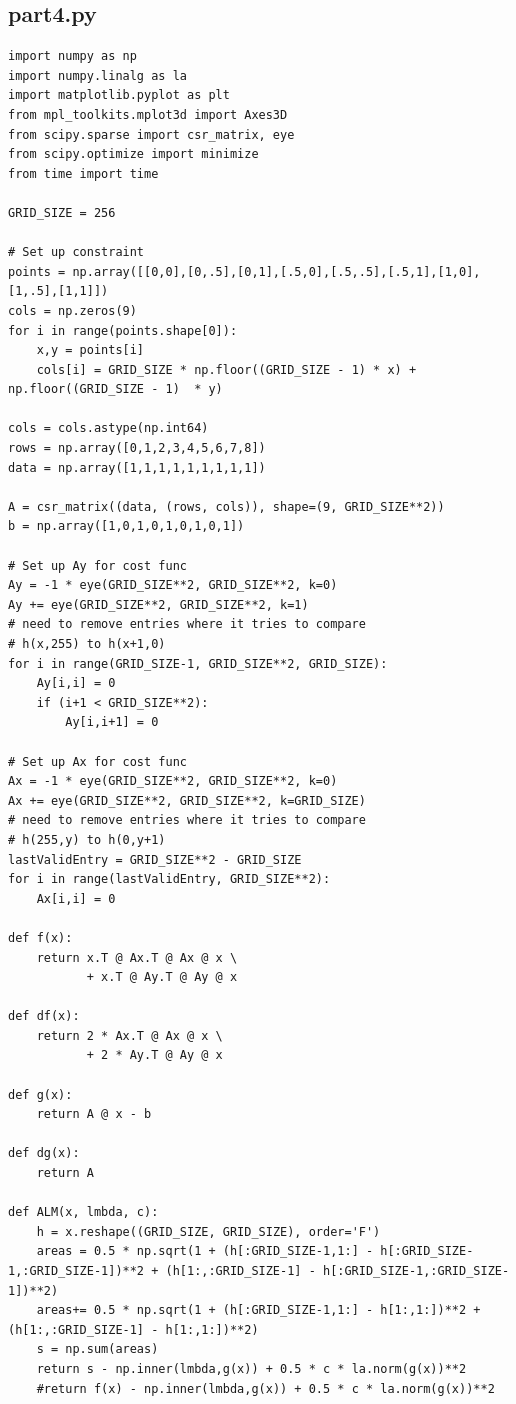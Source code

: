 \documentclass{article}
\begin{document}
\subsection{part4.py}
\begin{verbatim}
import numpy as np
import numpy.linalg as la
import matplotlib.pyplot as plt
from mpl_toolkits.mplot3d import Axes3D
from scipy.sparse import csr_matrix, eye
from scipy.optimize import minimize
from time import time

GRID_SIZE = 256

# Set up constraint
points = np.array([[0,0],[0,.5],[0,1],[.5,0],[.5,.5],[.5,1],[1,0],[1,.5],[1,1]])
cols = np.zeros(9)
for i in range(points.shape[0]):
    x,y = points[i]
    cols[i] = GRID_SIZE * np.floor((GRID_SIZE - 1) * x) + np.floor((GRID_SIZE - 1)  * y)

cols = cols.astype(np.int64)
rows = np.array([0,1,2,3,4,5,6,7,8])
data = np.array([1,1,1,1,1,1,1,1,1])

A = csr_matrix((data, (rows, cols)), shape=(9, GRID_SIZE**2))
b = np.array([1,0,1,0,1,0,1,0,1])

# Set up Ay for cost func
Ay = -1 * eye(GRID_SIZE**2, GRID_SIZE**2, k=0)
Ay += eye(GRID_SIZE**2, GRID_SIZE**2, k=1)
# need to remove entries where it tries to compare
# h(x,255) to h(x+1,0)
for i in range(GRID_SIZE-1, GRID_SIZE**2, GRID_SIZE):
    Ay[i,i] = 0
    if (i+1 < GRID_SIZE**2):
        Ay[i,i+1] = 0

# Set up Ax for cost func
Ax = -1 * eye(GRID_SIZE**2, GRID_SIZE**2, k=0)
Ax += eye(GRID_SIZE**2, GRID_SIZE**2, k=GRID_SIZE)
# need to remove entries where it tries to compare
# h(255,y) to h(0,y+1)
lastValidEntry = GRID_SIZE**2 - GRID_SIZE
for i in range(lastValidEntry, GRID_SIZE**2):
    Ax[i,i] = 0

def f(x):
    return x.T @ Ax.T @ Ax @ x \
           + x.T @ Ay.T @ Ay @ x

def df(x):
    return 2 * Ax.T @ Ax @ x \
           + 2 * Ay.T @ Ay @ x

def g(x):
    return A @ x - b

def dg(x):
    return A

def ALM(x, lmbda, c):
    h = x.reshape((GRID_SIZE, GRID_SIZE), order='F')
    areas = 0.5 * np.sqrt(1 + (h[:GRID_SIZE-1,1:] - h[:GRID_SIZE-1,:GRID_SIZE-1])**2 + (h[1:,:GRID_SIZE-1] - h[:GRID_SIZE-1,:GRID_SIZE-1])**2)
    areas+= 0.5 * np.sqrt(1 + (h[:GRID_SIZE-1,1:] - h[1:,1:])**2 + (h[1:,:GRID_SIZE-1] - h[1:,1:])**2)
    s = np.sum(areas)
    return s - np.inner(lmbda,g(x)) + 0.5 * c * la.norm(g(x))**2
    #return f(x) - np.inner(lmbda,g(x)) + 0.5 * c * la.norm(g(x))**2


\end{verbatim}
\end{document}
